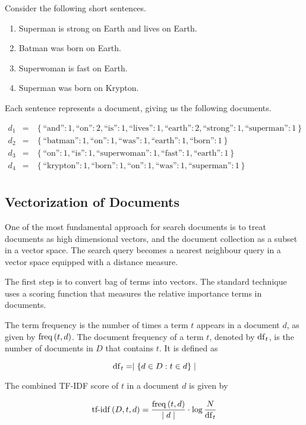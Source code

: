 	\begin{ex}
	\label{ex:superhero-documents}
		Consider the following short sentences.
		
		\begin{enumerate}
			\item Superman is strong on Earth and lives on Earth.
			\item Batman was born on Earth.
			\item Superwoman is fast on Earth.
			\item Superman was born on Krypton.
		\end{enumerate}
		
		Each sentence represents a document, giving us the following documents.
		
		\begin{eqnarray*}
			d_1 &=& \left\{\textrm{``and''}: 1, \textrm{``on''}: 2, \textrm{``is''}: 1, \textrm{``lives''}: 1, \textrm{``earth''}: 2, \textrm{``strong''}: 1, \textrm{``superman''}: 1\right\} \\
			d_2 &=& \left\{\textrm{``batman''}: 1, \textrm{``on''}: 1, \textrm{``was''}: 1, \textrm{``earth''}: 1, \textrm{``born''}: 1\right\} \\
			d_3 &=& \left\{\textrm{``on''}: 1, \textrm{``is''}: 1, \textrm{``superwoman''}: 1, \textrm{``fast''}: 1, \textrm{``earth''}: 1\right\} \\
			d_4 &=& \left\{\textrm{``krypton''}: 1, \textrm{``born''}: 1, \textrm{``on''}: 1, \textrm{``was''}: 1, \textrm{``superman''}: 1\right\} \\
		\end{eqnarray*}
	\end{ex}
	
	\subsection{Vectorization of Documents}
	\label{sec:vectorization-of-documents}
		One of the most fundamental approach for search documents is to treat documents as high dimensional vectors, and the document collection as a subset in a vector space.  The search query becomes a nearest neighbour query in a vector space equipped with a distance measure.
		
		The first step is to convert bag of terms into vectors.  The standard technique \cite{ir-08} uses a scoring function that measures the relative importance terms in documents.
		
		\begin{defn}
			The term frequency is the number of times a term $t$ appears in a document $d$, as given by $\operatorname{freq}\left(t, d\right)$.  The document frequency of a term $t$, denoted by $\operatorname{df}_t$, is the number of documents in $D$ that contains $t$.  It is defined as
			
			$$\operatorname{df}_t = \mid \left\{d \in D: t \in d\right\} \mid$$
			
			The combined TF-IDF score of $t$ in a document $d$ is given by
			
			$$\operatorname{tf-idf}\left(D, t, d\right) = \frac{\operatorname{freq}\left(t, d\right)}{\mid d \mid} \cdot \log{\frac{N}{\operatorname{df}_t}}$$
		\end{defn}
		
